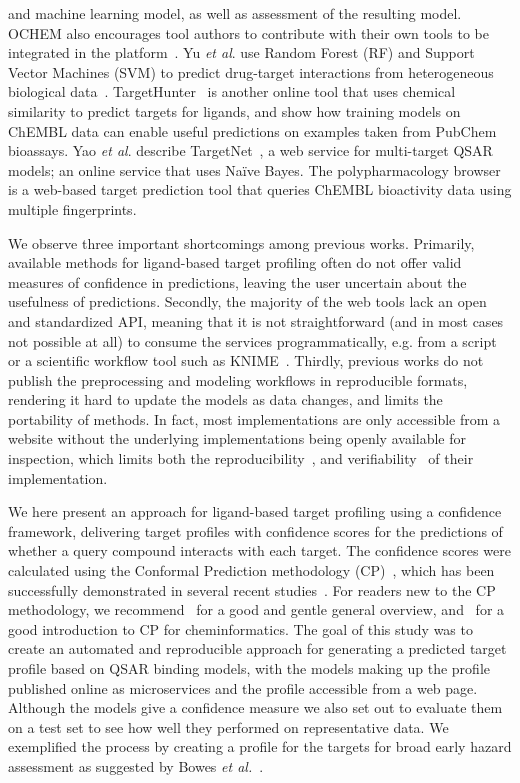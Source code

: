 \documentclass[utf8]{frontiersSCNS} %
\begin{document}
and machine learning model, as well as assessment of the resulting
model. OCHEM also encourages tool authors to contribute with their own tools
to be integrated in the platform~\cite{Sushko2011}.
%
Yu \textit{et al}. use Random Forest (RF) and Support Vector Machines (SVM) to predict
drug-target interactions from heterogeneous biological data~\cite{Yu:2012ol}.
%
TargetHunter~\cite{Wang:2013le} is another online tool that uses chemical
similarity to predict targets for ligands, and show how training models on
ChEMBL data can enable useful predictions on examples taken from PubChem
bioassays.
%
Yao \textit{et al}. describe TargetNet~\cite{Yao:2016ij}, a web service for
multi-target QSAR models; an online service that uses Na\"ive Bayes.
%
The polypharmacology browser~\cite{Awale:2017is} is a web-based target
prediction tool that queries ChEMBL bioactivity data using multiple
fingerprints.

We observe three important shortcomings among previous works. Primarily,
available methods for ligand-based target profiling often do not offer valid
measures of confidence in predictions, leaving the user uncertain about the
usefulness of predictions. Secondly, the majority of the web tools lack an
open and standardized API, meaning that it is not straightforward (and in
most cases not possible at all) to consume the services programmatically,
e.g. from a script or a scientific workflow tool such as
KNIME~\cite{Mazanetz:2012gy}. Thirdly, previous works do not publish the
preprocessing and modeling workflows in reproducible formats, rendering it
hard to update the models as data changes, and limits the portability of
methods. In fact, most implementations are only accessible from a website
without the underlying implementations being openly available for inspection,
which limits both the reproducibility~\cite{Stodden2016}, and
verifiability~\cite{Hinsen2018} of their implementation.

We here present an approach for ligand-based target profiling using a
confidence framework, delivering target profiles with confidence scores for
the predictions of whether a query compound interacts with each target. The
confidence scores were calculated using the Conformal Prediction methodology
(CP)~\cite{Vovk2005}, which has been successfully demonstrated in several
recent
studies~\cite{Cortes-Ciriano:2015ec,Norinder:2014fe,Forreryd:2018kb,Norinder:2016qf}.
For readers new to the CP methodology, we recommend~\cite{Gammerman2007} for
a good and gentle general overview, and~\cite{Norinder:2014fe} for a good
introduction to CP for cheminformatics.
%
The goal of this study was to create an automated and reproducible approach for
generating a predicted target profile based on QSAR binding models, with the models
making up the profile published online as microservices and the profile
accessible from a web page. Although the models give a confidence measure we
also set out to evaluate them on a test set to see how well they performed on
representative data. We exemplified the process by creating a profile for the
targets for broad early hazard assessment as suggested by Bowes \textit{et
al.}~\cite{Bowes2012}.
\end{document}
